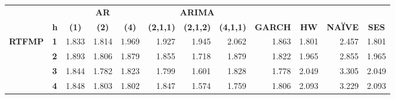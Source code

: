 \begin{table}[htbp]
  \centering
    \begin{tabular}{|cl|rrrrrrrrrr|}
\cmidrule{3-12}    \multicolumn{1}{r}{} &       & \multicolumn{3}{c}{\textbf{AR}} & \multicolumn{3}{c}{\textbf{ARIMA}} &       &       &       &  \\
    \multicolumn{1}{r}{} & \textbf{h} & \multicolumn{1}{c}{\textbf{(1)}} & \multicolumn{1}{c}{\textbf{(2)}} & \multicolumn{1}{c}{\textbf{(4)}} & \multicolumn{1}{c}{\textbf{(2,1,1)}} & \multicolumn{1}{c}{\textbf{(2,1,2)}} & \multicolumn{1}{c}{\textbf{(4,1,1)}} & \multicolumn{1}{c}{\textbf{GARCH}} & \multicolumn{1}{c}{\textbf{HW}} & \multicolumn{1}{c}{\textbf{NAÏVE}} & \multicolumn{1}{c|}{\textbf{SES}} \\
    \midrule
    \multirow{5}[2]{*}{\textbf{RTFMP}} & \textbf{1} & \cellcolor[rgb]{ .824,  .824,  .824}1.833 & \cellcolor[rgb]{ .824,  .824,  .824}1.814 & \cellcolor[rgb]{ .808,  .808,  .808}1.969 & \cellcolor[rgb]{ .812,  .812,  .812}1.927 & \cellcolor[rgb]{ .812,  .812,  .812}1.945 & \cellcolor[rgb]{ .796,  .796,  .796}2.062 & \cellcolor[rgb]{ .82,  .82,  .82}1.863 & \cellcolor[rgb]{ .827,  .827,  .827}1.801 & \cellcolor[rgb]{ .749,  .749,  .749}2.457 & \cellcolor[rgb]{ .827,  .827,  .827}1.801 \\
          & \textbf{2} & \cellcolor[rgb]{ .816,  .816,  .816}1.893 & \cellcolor[rgb]{ .827,  .827,  .827}1.806 & \cellcolor[rgb]{ .82,  .82,  .82}1.879 & \cellcolor[rgb]{ .82,  .82,  .82}1.855 & \cellcolor[rgb]{ .835,  .835,  .835}1.718 & \cellcolor[rgb]{ .82,  .82,  .82}1.879 & \cellcolor[rgb]{ .824,  .824,  .824}1.822 & \cellcolor[rgb]{ .808,  .808,  .808}1.965 & \cellcolor[rgb]{ .706,  .706,  .706}2.855 & \cellcolor[rgb]{ .808,  .808,  .808}1.965 \\
          & \textbf{3} & \cellcolor[rgb]{ .824,  .824,  .824}1.844 & \cellcolor[rgb]{ .827,  .827,  .827}1.782 & \cellcolor[rgb]{ .824,  .824,  .824}1.823 & \cellcolor[rgb]{ .827,  .827,  .827}1.799 & \cellcolor[rgb]{ .851,  .851,  .851}1.601 & \cellcolor[rgb]{ .824,  .824,  .824}1.828 & \cellcolor[rgb]{ .831,  .831,  .831}1.778 & \cellcolor[rgb]{ .8,  .8,  .8}2.049 & \cellcolor[rgb]{ .651,  .651,  .651}3.305 & \cellcolor[rgb]{ .8,  .8,  .8}2.049 \\
          & \textbf{4} & \cellcolor[rgb]{ .82,  .82,  .82}1.848 & \cellcolor[rgb]{ .827,  .827,  .827}1.803 & \cellcolor[rgb]{ .827,  .827,  .827}1.802 & \cellcolor[rgb]{ .82,  .82,  .82}1.847 & \cellcolor[rgb]{ .851,  .851,  .851}1.574 & \cellcolor[rgb]{ .831,  .831,  .831}1.759 & \cellcolor[rgb]{ .827,  .827,  .827}1.806 & \cellcolor[rgb]{ .792,  .792,  .792}2.093 & \cellcolor[rgb]{ .663,  .663,  .663}3.229 & \cellcolor[rgb]{ .792,  .792,  .792}2.093 \\

\end{tabular}
\end{table}
